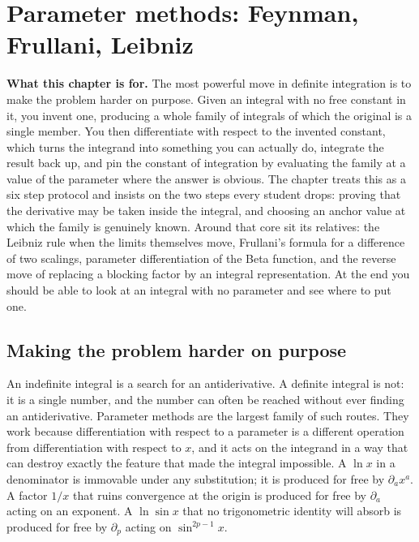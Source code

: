 \chapter{Parameter methods: Feynman, Frullani, Leibniz}

\begin{orient}
\textbf{What this chapter is for.} The most powerful move in definite integration is to make the problem harder on purpose. Given an integral with no free constant in it, you invent one, producing a whole family of integrals of which the original is a single member. You then differentiate with respect to the invented constant, which turns the integrand into something you can actually do, integrate the result back up, and pin the constant of integration by evaluating the family at a value of the parameter where the answer is obvious. The chapter treats this as a six step protocol and insists on the two steps every student drops: proving that the derivative may be taken inside the integral, and choosing an anchor value at which the family is genuinely known. Around that core sit its relatives: the Leibniz rule when the limits themselves move, Frullani's formula for a difference of two scalings, parameter differentiation of the Beta function, and the reverse move of replacing a blocking factor by an integral representation. At the end you should be able to look at an integral with no parameter and see where to put one.
\end{orient}

\section{Making the problem harder on purpose}

An indefinite integral is a search for an antiderivative. A definite integral is not: it is a single number, and the number can often be reached without ever finding an antiderivative. Parameter methods are the largest family of such routes. They work because differentiation with respect to a parameter is a different operation from differentiation with respect to $x$, and it acts on the integrand in a way that can destroy exactly the feature that made the integral impossible. A $\ln x$ in a denominator is immovable under any substitution; it is produced for free by $\partial_a x^{a}$. A factor $1/x$ that ruins convergence at the origin is produced for free by $\partial_a$ acting on an exponent. A $\ln\sin x$ that no trigonometric identity will absorb is produced for free by $\partial_p$ acting on $\sin^{2p-1}x$.

